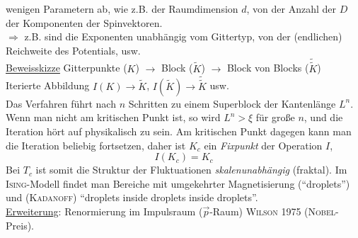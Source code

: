 \begin{enumerate}[A)]
    wenigen Parametern ab, wie z.B. der Raumdimension $d$, von der Anzahl der $D$ der Komponenten der Spinvektoren. \\
    $\Rightarrow$ z.B. sind die Exponenten unabhängig vom Gittertyp, von der (endlichen) Reichweite des Potentials, usw. \\
    \underline{Beweisskizze} Gitterpunkte ($K$) $\rightarrow$ Block ($\tilde{K}$) $\rightarrow$ Block von Blocks ($\tilde{\tilde{K}}$) \\
    Iterierte Abbildung $I(K) \rightarrow \tilde{K}$, $I(\tilde{K}) \rightarrow \tilde{\tilde{K}}$ usw. \\
    Das Verfahren führt nach $n$ Schritten zu einem Superblock der Kantenlänge $L^n$. Wenn man nicht am kritischen Punkt ist, so wird $L^n > \xi$
    für große $n$, und die Iteration hört auf physikalisch zu sein. Am kritischen Punkt dagegen kann man die Iteration beliebig fortsetzen,
    daher ist $K_c$ ein \emph{Fixpunkt} der Operation $I$,
    \begin{equation}
        I(K_c) = K_c
    \end{equation}
    Bei $T_c$ ist somit die Struktur der Fluktuationen \emph{skalenunabhängig} (fraktal). Im \textsc{Ising}-Modell findet man Bereiche mit 
    umgekehrter Magnetisierung ("`droplets"') und (\textsc{Kadanoff}) "`droplets inside droplets inside droplets"'. \\
    \underline{Erweiterung}: Renormierung im Impulsraum ($\vec{p}$-Raum) \textsc{Wilson} 1975 (\textsc{Nobel}-Preis).
\end{enumerate}